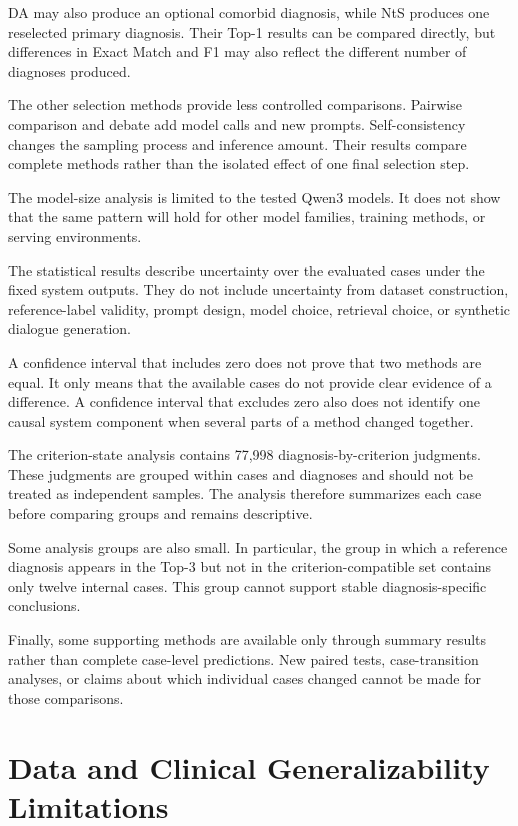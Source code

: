 \documentclass[12pt,a4paper,oneside]{report}
\begin{document}
DA may also produce an optional comorbid diagnosis, while NtS produces
one reselected primary diagnosis. Their Top-1 results can be compared
directly, but differences in Exact Match and F1 may also reflect the
different number of diagnoses produced.

The other selection methods provide less controlled comparisons.
Pairwise comparison and debate add model calls and new prompts.
Self-consistency changes the sampling process and inference amount.
Their results compare complete methods rather than the isolated effect
of one final selection step.

The model-size analysis is limited to the tested Qwen3 models. It does
not show that the same pattern will hold for other model families,
training methods, or serving environments.

The statistical results describe uncertainty over the evaluated cases
under the fixed system outputs. They do not include uncertainty from
dataset construction, reference-label validity, prompt design, model
choice, retrieval choice, or synthetic dialogue generation.

A confidence interval that includes zero does not prove that two methods
are equal. It only means that the available cases do not provide clear
evidence of a difference. A confidence interval that excludes zero also
does not identify one causal system component when several parts of a
method changed together.

The criterion-state analysis contains 77,998 diagnosis-by-criterion
judgments. These judgments are grouped within cases and diagnoses and
should not be treated as independent samples. The analysis therefore
summarizes each case before comparing groups and remains descriptive.

Some analysis groups are also small. In particular, the group in which
a reference diagnosis appears in the Top-3 but not in the
criterion-compatible set contains only twelve internal cases. This group
cannot support stable diagnosis-specific conclusions.

Finally, some supporting methods are available only through summary
results rather than complete case-level predictions. New paired tests,
case-transition analyses, or claims about which individual cases changed
cannot be made for those comparisons.

\section{Data and Clinical Generalizability Limitations}
\end{document}
